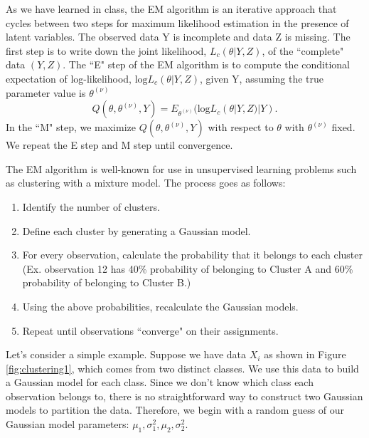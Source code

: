 \documentclass[11pt]{article}
\begin{document}
As we have learned in class, the EM algorithm is an iterative approach that cycles between two steps for maximum likelihood estimation in the presence of latent variables. The observed data Y is incomplete and data Z is missing. The first step is to write down the joint likelihood, $L_c(
\theta|Y,Z)$, of the ``complete" data $(Y,Z)$. The ``E" step of the EM algorithm is to compute the conditional expectation of log-likelihood, $\text{log}L_c(
\theta|Y,Z)$, given Y, assuming the true parameter value is $\theta^{(\nu)}$
\[Q(\theta,\theta^{(\nu)},Y)=E_{\theta^{(\nu)}}(\text{log}L_c(
\theta|Y,Z)|Y).\] In the ``M" step, we maximize $Q(\theta,\theta^{(\nu)},Y)$ with respect to $\theta$ with $\theta^{(\nu)}$ fixed. We repeat the E step and M step until convergence.  

The EM algorithm is well-known for use in unsupervised learning problems such as clustering with a mixture model. The process goes as follows:
\begin{enumerate}
    \item Identify the number of clusters. 
    \item Define each cluster by generating a Gaussian model. 
    \item For every observation, calculate the probability that it belongs to each cluster (Ex. observation 12 has 40\% probability of belonging to Cluster A and 60\% probability of belonging to Cluster B.)
    \item Using the above probabilities, recalculate the Gaussian models. 
    \item Repeat until observations ``converge" on their assignments. 
\end{enumerate}

Let's consider a simple example. Suppose we have data $X_i$ as shown in Figure \ref{fig:clustering1}, which comes from two distinct classes. We use this data to build a Gaussian model for each class. Since we don't know which class each observation belongs to, there is no straightforward way to construct two Gaussian models to partition the data. Therefore, we begin with a random guess of our Gaussian model parameters: $\mu_1,\sigma^2_1, \mu_2,\sigma^2_2$. 
\end{document}
